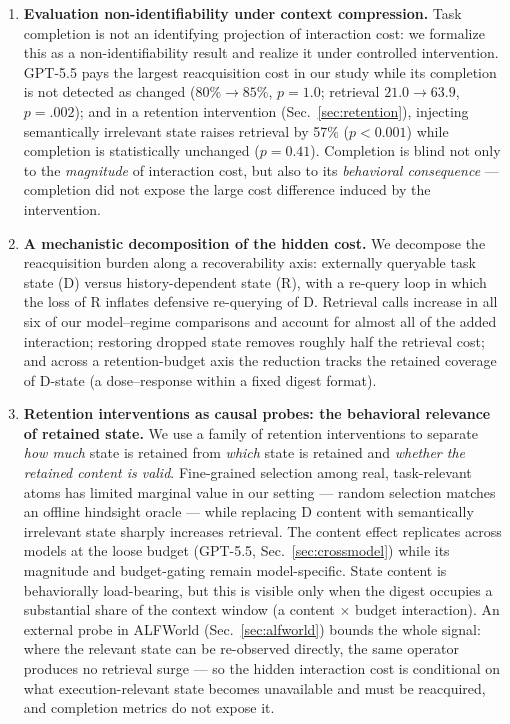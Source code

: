 \documentclass[11pt]{article}
\begin{document}
\begin{enumerate}
\item \textbf{Evaluation non-identifiability under context compression.}
  Task completion is not an identifying projection of interaction cost: we formalize this
  as a non-identifiability result and realize it under controlled intervention. GPT-5.5
  pays the largest reacquisition cost in our study while its completion is not detected
  as changed ($80\% \to 85\%$, $p = 1.0$; retrieval $21.0 \to 63.9$, $p = .002$); and in a retention
  intervention (Sec.~\ref{sec:retention}), injecting semantically irrelevant state raises retrieval by 57\%
  ($p < 0.001$) while completion is statistically unchanged ($p = 0.41$). Completion is
  blind not only to the \emph{magnitude} of interaction cost, but also to its \emph{behavioral
  consequence} --- completion did not expose the large cost difference induced by the
  intervention.

\item \textbf{A mechanistic decomposition of the hidden cost.} We decompose the reacquisition
  burden along a recoverability axis: externally queryable task state (D) versus
  history-dependent state (R), with a re-query loop in which the loss of R inflates
  defensive re-querying of D. Retrieval calls increase in all six of our model--regime
  comparisons and account for almost all of the added interaction; restoring dropped
  state removes roughly half the retrieval cost; and across a retention-budget axis the
  reduction tracks the retained coverage of D-state (a dose--response within a fixed
  digest format).

\item \textbf{Retention interventions as causal probes: the behavioral relevance of retained
  state.} We use a family of retention interventions to separate \emph{how much} state is
  retained from \emph{which} state is retained and \emph{whether the retained content is valid}.
  Fine-grained selection among real, task-relevant atoms has limited marginal value in
  our setting --- random selection matches an offline hindsight oracle --- while replacing D
  content with semantically irrelevant state sharply increases retrieval. The content
  effect replicates across models at the loose budget (GPT-5.5, Sec.~\ref{sec:crossmodel}) while its
  magnitude and budget-gating remain model-specific. State content is behaviorally
  load-bearing, but this is visible only when the digest occupies a substantial share of
  the context window (a content $\times$ budget interaction). An external probe in ALFWorld
  (Sec.~\ref{sec:alfworld}) bounds the whole signal: where the relevant state can be re-observed directly,
  the same operator produces no retrieval surge --- so the hidden interaction cost is
  conditional on what execution-relevant state becomes unavailable and must be
  reacquired, and completion metrics do not expose it.
\end{enumerate}
\end{document}
